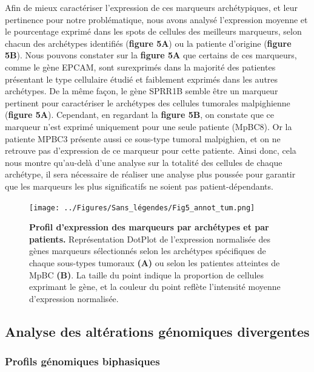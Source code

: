 \documentclass[11pt]{article}
\begin{document}
Afin de mieux caractériser l’expression de ces marqueurs archétypiques, et leur pertinence pour notre problématique, nous avons analysé l’expression moyenne et le pourcentage exprimé dans les spots de cellules des meilleurs marqueurs, selon chacun des archétypes identifiés (\textbf{figure 5A}) ou la patiente d’origine (\textbf{figure 5B}). Nous pouvons constater sur la \textbf{figure 5A} que certains de ces marqueurs, comme le gène EPCAM, sont surexprimés dans la majorité des patientes présentant le type cellulaire étudié et faiblement exprimés dans les autres archétypes. De la même façon, le gène SPRR1B semble être un marqueur pertinent pour caractériser le archétypes des cellules tumorales malpighienne (\textbf{figure 5A}). Cependant, en regardant la \textbf{figure 5B}, on constate que ce marqueur n’est exprimé uniquement pour une seule patiente (MpBC8). Or la patiente MPBC3 présente aussi ce sous-type tumoral malpighien, et on ne retrouve pas d’expression de ce marqueur pour cette patiente. Ainsi donc, cela nous montre qu’au-delà d’une analyse sur la totalité des cellules de chaque archétype, il sera nécessaire de réaliser une analyse plus poussée pour garantir que les marqueurs les plus significatifs ne soient pas patient-dépendants.

\begin{figure}[H]
    \centering
    \texttt{[image: ../Figures/Sans\_légendes/Fig5\_annot\_tum.png]}
    \caption[\textbf{Figure 5 : Profil d’expression des marqueurs par archétypes et par patients.}]{\footnotesize \textbf{Profil d’expression des marqueurs par archétypes et par patients.} Représentation DotPlot de l’expression normalisée des gènes marqueurs sélectionnés selon les archétypes spécifiques de chaque sous-types tumoraux \textbf{(A)} ou selon les patientes atteintes de MpBC \textbf{(B)}. La taille du point indique la proportion de cellules exprimant le gène, et la couleur du point reflète l’intensité moyenne d’expression normalisée.}
    \label{fig:fig5}
\end{figure}

\subsection{Analyse des altérations génomiques divergentes}

\subsubsection{Profils génomiques biphasiques}
\end{document}
